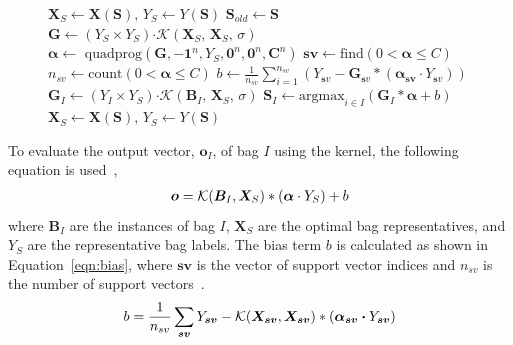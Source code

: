 \begin{figure}[tpb]
\begin{algorithm}[H]
\begin{algorithmic}[1]
\EndFor
\State $\bm X_S \leftarrow \bm X(\bm S),\,Y_S \leftarrow Y(\bm S)$ 
\State $\bm S_{old} \leftarrow \bm S$
\State $\bm G \leftarrow (Y_S \times Y_S) \bm \cdot \mathcal{K}\left( \bm X_S,\,\bm X_S,\,\sigma\right)$ 
\State $\bm \alpha \leftarrow \text{ quadprog}\left(\bm G, \bm{-1}^n, Y_S, \bm 0^n, \bm 0^n, \bm C^n\right)$ 
\State $\bm{sv} \leftarrow \text{find}\left(0 < \bm \alpha \leq C \right)$ 
\State $n_{sv} \leftarrow \text{count}\left(0 < \bm \alpha \leq C \right)$ 
\State $b \leftarrow \frac{1}{n_{sv}}\sum_{i=1}^{n_{sv}} \left(Y_{\bm sv} - \bm G_{\bm sv}*\left(\bm{\alpha_{\bm sv}} \cdot Y_{\bm sv}\right)\right)$ 
\State $\bm G_I \leftarrow (Y_I \times Y_S) \bm \cdot \mathcal{K}\left( \bm B_I,\,\bm X_S,\,\sigma\right)$
\State $\bm S_I \leftarrow \text{argmax}_{i \in I}\left(\bm G_I*\bm{\alpha} + b \right)$ \tab\tab[0.62cm]
\EndFor
\State $\bm X_S \leftarrow \bm X(\bm S),\,Y_S \leftarrow Y(\bm S)$ 
\EndWhile 
\end{algorithmic} 
\end{algorithm}
\end{figure}

To evaluate the output vector, $\bm o_I$, of bag $I$ using the kernel, the following equation is used~\citep{Huang2006},
\begin{align}
\bm o = \mathcal{K}(\bm B_I,\bm X_S)*(\bm\alpha \cdot Y_S) + b
\end{align}
where $\bm B_I$ are the instances of bag $I$, $\bm X_S$ are the optimal bag representatives, and $Y_S$ are the representative bag labels. The bias term $b$ is calculated as shown in Equation~\ref{eqn:bias}, where $\bm{sv}$ is the vector of support vector indices and $n_{sv}$ is the number of support vectors~\citep{Huang2006}.
\begin{align}
\label{eqn:bias}
b = \frac{1}{n_{sv}}\sum_{\bm{sv}} Y_{\bm{sv}} - \mathcal{K}(\bm X_{\bm{sv}},\bm X_{\bm{sv}})*(\bm \alpha_{\bm{sv}}\bm\cdot Y_{\bm{sv}})
\end{align}

